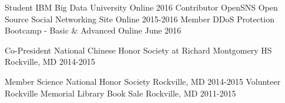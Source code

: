 

\begin{cvhonors}
  \cvhonor
    {Student}
    {IBM Big Data University}
    {Online}
    {2016}
  \cvhonor
    {Contributor}
    {OpenSNS Open Source Social Networking Site}
    {Online}
    {2015-2016}
  \cvhonor
    {Member}
    {DDoS Protection Bootcamp - Basic \& Advanced}
    {Online}
    {June 2016}

  \cvhonor
    {Co-President}
    {National Chinese Honor Society at Richard Montgomery HS}
    {Rockville, MD}
    {2014-2015}

  \cvhonor
    {Member}
    {Science National Honor Society}
    {Rockville, MD}
    {2014-2015}
  \cvhonor
    {Volunteer}
    {Rockville Memorial Library Book Sale}
    {Rockville, MD}
    {2011-2015}


\end{cvhonors}

